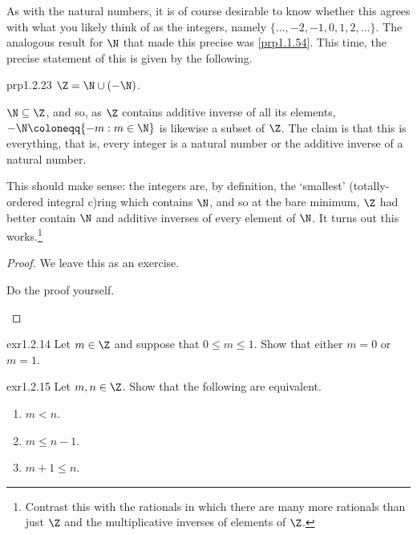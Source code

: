 As with the natural numbers, it is of course desirable to know whether this agrees with what you likely think of as the integers, namely $\{ \ldots ,-2,-1,0,1,2,\ldots \}$.  The analogous result for $\N$ that made this precise was \cref{prp1.1.54}.  This time, the precise statement of this is given by the following.
\begin{prp}{}{prp1.2.23}
$\Z =\N \cup (-\N )$.
\begin{rmk}
$\N \subseteq \Z$, and so, as $\Z$ contains additive inverse of all its elements, $-\N \coloneqq \{ -m:m\in \N \}$ is likewise a subset of $\Z$.  The claim is that this is everything, that is, every integer is a natural number or the additive inverse of a natural number.

This should make sense:  the integers are, by definition, the `smallest' (totally-ordered integral c)ring which contains $\N$, and so at the bare minimum, $\Z$ had better contain $\N$ and additive inverses of every element of $\N$.  It turns out this works.\footnote{Contrast this with the rationals in which there are many more rationals than just $\Z$ and the multiplicative inverses of elements of $\Z$.}
\end{rmk}
\begin{proof}
We leave this as an exercise.
\begin{exr}{}{}
Do the proof yourself.
\end{exr}
\end{proof}
\end{prp}
\begin{exr}{}{exr1.2.14}
Let $m\in \Z$ and suppose that $0\leq m\leq 1$.  Show that either $m=0$ or $m=1$.
\end{exr}
\begin{exr}{}{exr1.2.15}
Let $m,n\in \Z$.  Show that the following are equivalent.
\begin{enumerate}
\item $m<n$.
\item $m\leq n-1$.
\item $m+1\leq n$.
\end{enumerate}
\end{exr}

